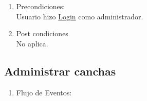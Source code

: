 \documentclass[a4paper,11pt]{article}
\begin{document}
\begin{enumerate}
    \item Precondiciones: \\
        Usuario hizo \underline{Login} como administrador.

    \item Post condiciones \\
        No aplica.

\end{enumerate}


\subsection{Administrar canchas}
\begin{enumerate}


    \begin{enumerate}
    \item Descripción breve: \\
        Este caso de uso describe las operaciones de creación, borrado y
        modificación de canchas.
    \item Actores \\
        Administrador.
    \item Disparadores: \\
        El administrador selecciona las operaciones explícitamente de la página
        de administración de un complejo existente.
    \end{enumerate}

    \item Flujo de Eventos: 

    \begin{enumerate}


\end{enumerate}
\end{enumerate}
\end{document}
